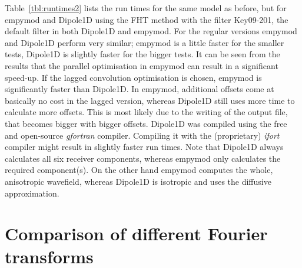 \documentclass[manuscript,revised]{geophysics}
\begin{document}
Table~\ref{tbl:runtimes2} lists the run times for the same model as before, but
for empymod and Dipole1D using the FHT method with the filter Key09-201, the
default filter in both Dipole1D and empymod. For the regular versions empymod
and Dipole1D perform very similar; empymod is a little faster for the smaller
tests, Dipole1D is slightly faster for the bigger tests. It can be seen from
the results that the parallel optimisation in empymod can result in a
significant speed-up. If the lagged convolution optimisation is chosen, empymod
is significantly faster than Dipole1D. In empymod, additional offsets come at
basically no cost in the lagged version, whereas Dipole1D still uses more time
to calculate more offsets. This is most likely due to the writing of the output
file, that becomes bigger with bigger offsets.
%
%
%
Dipole1D was compiled using the free and open-source \emph{gfortran} compiler.
Compiling it with the (proprietary) \emph{ifort} compiler might result in
slightly faster run times. Note that Dipole1D always calculates all six
receiver components, whereas empymod only calculates the required component(s).
On the other hand empymod computes the whole, anisotropic wavefield, whereas
Dipole1D is isotropic and uses the diffusive approximation.

\section{Comparison of different Fourier transforms}
\end{document}
